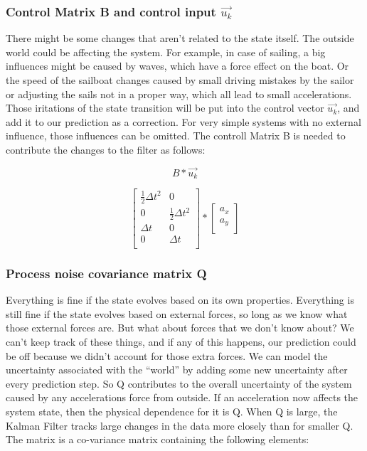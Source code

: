 \subsubsection{Control Matrix B and control input $\vec{u_{k}}$}
There might be some changes that aren’t related to the state itself. The outside world could be affecting the system.
For example, in case of sailing, a big influences might be caused by waves, which have a force effect on the boat. Or the speed of the sailboat changes caused by small driving mistakes by the sailor or adjusting the sails not in a proper way, which all lead to small accelerations. Those iritations of the state transition will be put into the control vector $\vec{u_{k}}$, and add it to our prediction as a correction.
For very simple systems with no external influence, those influences can be omitted.
The controll Matrix B is needed to contribute the changes to the filter as follows:

\begin{equation}
B * \vec{u_{k}}
\end{equation}

\begin{equation}
\begin{bmatrix} 
\frac{1}{2} \Delta{t^2} & 0  \\
0 & \frac{1}{2} \Delta{t^2} \\
\Delta{t} & 0  \\
0 & \Delta{t} \\
\end{bmatrix} 
* \begin{bmatrix} 
a_{x} \\
a_{y} \\
\end{bmatrix}  
\end{equation}


\subsubsection{Process noise covariance matrix Q}
Everything is fine if the state evolves based on its own properties. Everything is still fine if the state evolves based on external forces, so long as we know what those external forces are. But what about forces that we don’t know about? We can’t keep track of these things, and if any of this happens, our prediction could be off because we didn’t account for those extra forces. We can model the uncertainty associated with the “world” by adding some new uncertainty after every prediction step. So Q contributes to the overall uncertainty of the system caused by any accelerations force from outside. If an acceleration now affects the system state, then the physical dependence for it is Q. 
When Q is large, the Kalman Filter tracks large changes in the data more closely than for smaller Q. The matrix is a co-variance matrix containing the following elements:

